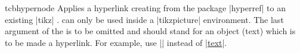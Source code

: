 \begin{docCommand}[doc new=2016-02-03]{tcbhypernode}{}
  Applies a hyperlink creating  from the package |hyperref| \cite{rahtz:hyperref}
  to an existing |tikz| .  can only
  be used inside a |tikzpicture| environment.
  The last argument of the  is to be omitted and should stand
  for an object (text) which is to be made a hyperlink.
  For example, use  |\hyperref[name]| instead of |\hyperref[name]{text}|.

\begin{dispExample}
\end{dispExample}

\end{docCommand}

